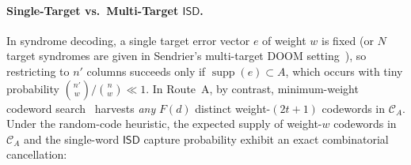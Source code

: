 \documentclass[11pt,a4paper]{article}
\theoremstyle{definition}
\theoremstyle{remark}
\newcommand{\supp}{\operatorname{supp}}
\newcommand{\ISD}{\mathsf{ISD}}
\begin{document}
\paragraph{Single-Target vs.\ Multi-Target $\ISD$.}
In syndrome decoding, a single target error vector $e$ of weight $w$ is fixed (or $N$ target syndromes are given in Sendrier's multi-target DOOM setting~\cite{Sen11}), so restricting to $n'$ columns succeeds only if $\supp(e) \subset A$, which occurs with tiny probability $\binom{n'}{w} / \binom{n}{w} \ll 1$. In Route~A, by contrast, minimum-weight codeword search~\cite{Leo88,CC98} harvests \emph{any} $F(d)$ distinct weight-$(2t+1)$ codewords in $\mathcal{C}_A$. Under the random-code heuristic, the expected supply of weight-$w$ codewords in $\mathcal{C}_A$ and the single-word $\ISD$ capture probability exhibit an exact combinatorial cancellation:
\end{document}
